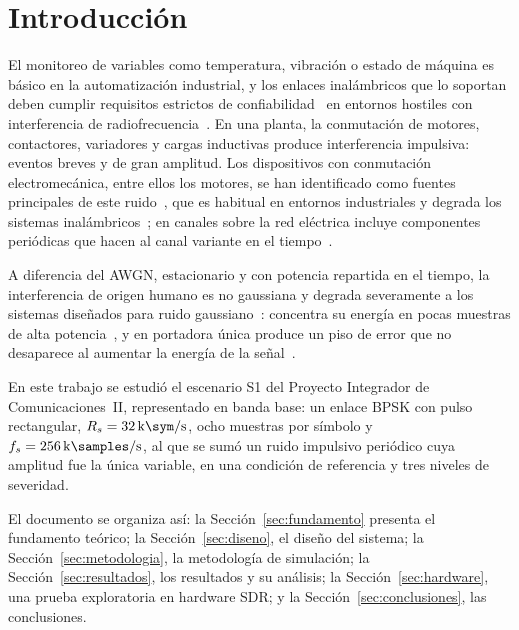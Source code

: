 \section{Introducción}\label{sec:introduccion}

El monitoreo de variables como temperatura, vibración o estado de máquina es
básico en la automatización industrial, y los enlaces inalámbricos que lo
soportan deben cumplir requisitos estrictos de confiabilidad~\cite{willig2005}
en entornos hostiles con interferencia de radiofrecuencia~\cite{gungor2009}. En
una planta, la conmutación de motores, contactores, variadores y cargas
inductivas produce interferencia impulsiva: eventos breves y de gran amplitud.
Los dispositivos con conmutación electromecánica, entre ellos los motores, se
han identificado como fuentes principales de este ruido~\cite{blackard1993}, que
es habitual en entornos industriales y degrada los sistemas
inalámbricos~\cite{chilo2009}; en canales sobre la red eléctrica incluye
componentes periódicas que hacen al canal variante en el tiempo~\cite{zimmermann2002}.

A diferencia del AWGN, estacionario y con potencia repartida en el tiempo, la
interferencia de origen humano es no gaussiana y degrada severamente a los
sistemas diseñados para ruido gaussiano~\cite{middleton1977}: concentra su
energía en pocas muestras de alta potencia~\cite{pighi2009}, y en portadora
única produce un piso de error que no desaparece al aumentar la energía de la
señal~\cite{ghosh1996}.

En este trabajo se estudió el escenario S1 del Proyecto Integrador de
Comunicaciones~II, representado en banda base: un enlace BPSK con pulso
rectangular, $R_s=\SI{32}{\kilo\sym\per\second}$, ocho muestras por símbolo y
$f_s=\SI{256}{\kilo\samples\per\second}$, al que se sumó un ruido impulsivo
periódico cuya amplitud fue la única variable, en una condición de referencia y
tres niveles de severidad.

El documento se organiza así: la Sección~\ref{sec:fundamento} presenta el
fundamento teórico; la Sección~\ref{sec:diseno}, el diseño del sistema; la
Sección~\ref{sec:metodologia}, la metodología de simulación; la
Sección~\ref{sec:resultados}, los resultados y su análisis; la
Sección~\ref{sec:hardware}, una prueba exploratoria en hardware SDR; y la
Sección~\ref{sec:conclusiones}, las conclusiones.
